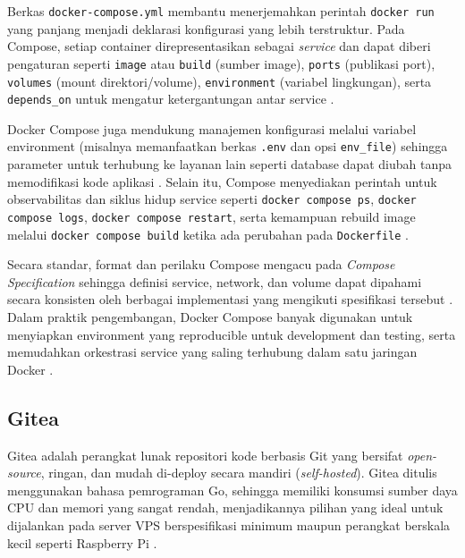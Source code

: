 \documentclass[a4paper,oneside,11pt]{book}
\begin{document}
\par Berkas \texttt{docker-compose.yml} membantu menerjemahkan perintah \texttt{docker run} yang panjang menjadi deklarasi konfigurasi yang lebih terstruktur. Pada Compose, setiap container direpresentasikan sebagai \textit{service} dan dapat diberi pengaturan seperti \texttt{image} atau \texttt{build} (sumber image), \texttt{ports} (publikasi port), \texttt{volumes} (mount direktori/volume), \texttt{environment} (variabel lingkungan), serta \texttt{depends\_on} untuk mengatur ketergantungan antar service \cite{docker-compose-file}.

\par Docker Compose juga mendukung manajemen konfigurasi melalui variabel environment (misalnya memanfaatkan berkas \texttt{.env} dan opsi \texttt{env\_file}) sehingga parameter untuk terhubung ke layanan lain seperti database dapat diubah tanpa memodifikasi kode aplikasi \cite{docker-compose-docs}. Selain itu, Compose menyediakan perintah untuk observabilitas dan siklus hidup service seperti \texttt{docker compose ps}, \texttt{docker compose logs}, \texttt{docker compose restart}, serta kemampuan rebuild image melalui \texttt{docker compose build} ketika ada perubahan pada \texttt{Dockerfile} \cite{docker-compose-docs}.

\par Secara standar, format dan perilaku Compose mengacu pada \textit{Compose Specification} sehingga definisi service, network, dan volume dapat dipahami secara konsisten oleh berbagai implementasi yang mengikuti spesifikasi tersebut \cite{compose-spec}. Dalam praktik pengembangan, Docker Compose banyak digunakan untuk menyiapkan environment yang reproducible untuk development dan testing, serta memudahkan orkestrasi service yang saling terhubung dalam satu jaringan Docker \cite{docker-docs,docker-compose-docs}.

\subsection{Gitea}

\par Gitea adalah perangkat lunak repositori kode berbasis Git yang bersifat \textit{open-source}, ringan, dan mudah di-deploy secara mandiri (\textit{self-hosted}). Gitea ditulis menggunakan bahasa pemrograman Go, sehingga memiliki konsumsi sumber daya CPU dan memori yang sangat rendah, menjadikannya pilihan yang ideal untuk dijalankan pada server VPS berspesifikasi minimum maupun perangkat berskala kecil seperti Raspberry Pi \cite{gitea-docs}.
\end{document}

